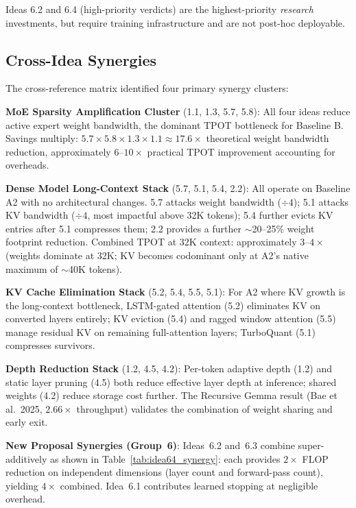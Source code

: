 \documentclass[11pt]{article}
\begin{document}
Ideas 6.2 and 6.4 (high-priority verdicts) are the highest-priority \emph{research} investments, but require training infrastructure and are not post-hoc deployable.

\subsection{Cross-Idea Synergies}

The cross-reference matrix identified four primary synergy clusters:

\textbf{MoE Sparsity Amplification Cluster} (1.1, 1.3, 5.7, 5.8): All four ideas reduce active expert weight bandwidth, the dominant TPOT bottleneck for Baseline B. Savings multiply: $5.7 \times 5.8 \times 1.3 \times 1.1 \approx 17.6\times$ theoretical weight bandwidth reduction, approximately $6$--$10\times$ practical TPOT improvement accounting for overheads.

\textbf{Dense Model Long-Context Stack} (5.7, 5.1, 5.4, 2.2): All operate on Baseline A2 with no architectural changes. 5.7 attacks weight bandwidth ($\div 4$); 5.1 attacks KV bandwidth ($\div 4$, most impactful above 32K tokens); 5.4 further evicts KV entries after 5.1 compresses them; 2.2 provides a further $\sim$20--25\% weight footprint reduction. Combined TPOT at 32K context: approximately $3$--$4\times$ (weights dominate at 32K; KV becomes codominant only at A2's native maximum of $\sim$40K tokens).

\textbf{KV Cache Elimination Stack} (5.2, 5.4, 5.5, 5.1): For A2 where KV growth is the long-context bottleneck, LSTM-gated attention (5.2) eliminates KV on converted layers entirely; KV eviction (5.4) and ragged window attention (5.5) manage residual KV on remaining full-attention layers; TurboQuant (5.1) compresses survivors.

\textbf{Depth Reduction Stack} (1.2, 4.5, 4.2): Per-token adaptive depth (1.2) and static layer pruning (4.5) both reduce effective layer depth at inference; shared weights (4.2) reduce storage cost further. The Recursive Gemma result (Bae et al.\ 2025, $2.66\times$ throughput) validates the combination of weight sharing and early exit.

\textbf{New Proposal Synergies (Group~6)}: Ideas~6.2 and~6.3 combine super-additively as shown in Table~\ref{tab:idea64_synergy}: each provides $2\times$ FLOP reduction on independent dimensions (layer count and forward-pass count), yielding $4\times$ combined. Idea~6.1 contributes learned stopping at negligible overhead.
\end{document}
